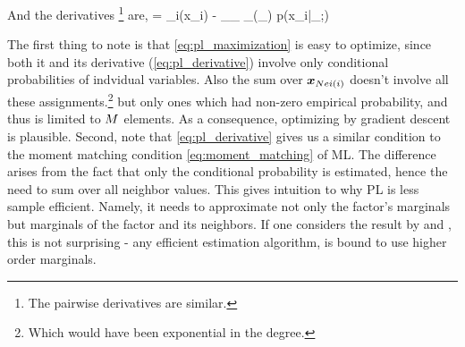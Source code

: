 \eean
And the derivatives \footnote{The pairwise derivatives are similar.} are,
\be
\label{eq:pl_derivative}
 =  \mub_i(x_i) - \sum_{\xx_{}} \mub_{}(\xx_{}) p(x_i|\xx_{};\thetav)
\ee

The first thing to note is that \eqref{eq:pl_maximization} is easy to optimize, since both it and its derivative (\eqref{eq:pl_derivative}) involve only conditional probabilities of indvidual variables. Also the sum over $\boldsymbol{x}_{Nei(i)}$ doesn't involve all these assignments.\footnote{Which would have been exponential in the degree.} but only ones which had non-zero empirical probability, and thus is limited to $M$ elements. 
As a consequence, optimizing by gradient descent is plausible.
Second, note that \eqref{eq:pl_derivative} gives us a similar condition to the moment matching condition \eqref{eq:moment_matching} of ML.
The difference arises from the fact that only the conditional probability is estimated, hence the need to sum over all neighbor values.
This gives intuition to why PL is less sample efficient. Namely, it needs to approximate not only the factor's marginals but marginals of the factor and its neighbors.
If one considers the result by \cite{bresler2014hardness} and \cite{montanari2015computational}, this is not surprising - any efficient estimation algorithm, is bound to use higher order marginals.

